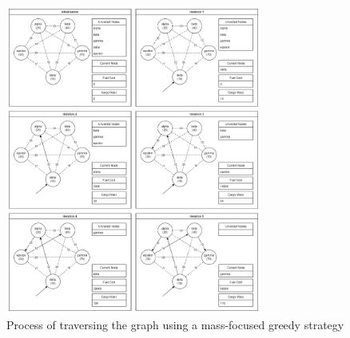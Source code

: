 \documentclass[
]{article}
\begin{document}
\begin{figure}
\centering
\includegraphics[width=0.75\textwidth,height=\textheight]{diagrams/greedy_diagram_new.png}
\caption{Process of traversing the graph using a mass-focused greedy
strategy}
\end{figure}

\newpage
\end{document}
